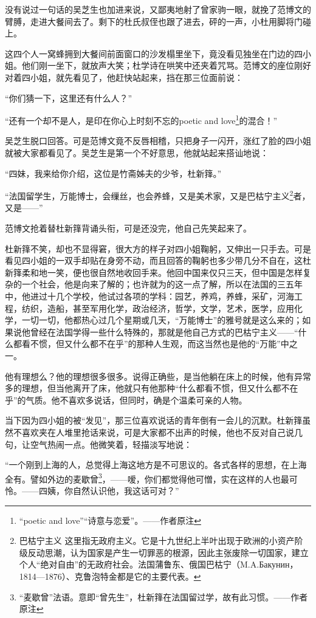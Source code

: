 \par 没有说过一句话的吴芝生也加进来说，又鄙夷地射了曾家驹一眼，就挽了范博文的臂膊，走进大餐间去了。剩下的杜氏叔侄也跟了进去，砰的一声，小杜用脚将门碰上。
\par 这四个人一窝蜂拥到大餐间前面窗口的沙发榻里坐下，竟没看见独坐在门边的四小姐。他们刚一坐下，就放声大笑；杜学诗在哄笑中还夹着咒骂。范博文的座位刚好对着四小姐，就先看见了，他赶快站起来，挡在那三位面前说：
\par “你们猜一下，这里还有什么人？”
\par “还有一个却不是人，是印在你心上时刻不忘的poetic and love\footnote{“poetic and love”“诗意与恋爱”。——作者原注}的混合！”
\par 吴芝生脱口回答。可是范博文竟不反唇相稽，只把身子一闪开，涨红了脸的四小姐就被大家都看见了。吴芝生是第一个不好意思，他就站起来搭讪地说：
\par “四妹，我来给你介绍，这位是竹斋姊夫的少爷，杜新箨。”
\par “法国留学生，万能博士，会缫丝，也会养蜂，又是美术家，又是巴枯宁主义\footnote{巴枯宁主义 这里指无政府主义。它是十九世纪上半叶出现于欧洲的小资产阶级反动思潮，认为国家是产生一切罪恶的根源，因此主张废除一切国家，建立个人“绝对自由”的无政府社会。法国蒲鲁东、俄国巴枯宁（M.A.Бакунин，1814—1876）、克鲁泡特金都是它的主要代表。}者，又是——”
\par 范博文抢着替杜新箨背诵头衔，可是还没完，他自己先笑起来了。
\par 杜新箨不笑，却也不显得窘，很大方的样子对四小姐鞠躬，又伸出一只手去。可是看见四小姐的一双手却贴在身旁不动，而且回答的鞠躬也多少带几分不自在，这杜新箨柔和地一笑，便也很自然地收回手来。他回中国来仅只三天，但中国是怎样复杂的一个社会，他是向来了解的；也许就为的这一点了解，所以在法国的三五年中，他进过十几个学校，他试过各项的学科：园艺，养鸡，养蜂，采矿，河海工程，纺织，造船，甚至军用化学，政治经济，哲学，文学，艺术，医学，应用化学，一切一切，他都热心过几个星期或几天，“万能博士”的雅号就是这么来的；如果说他曾经在法国学得一些什么特殊的，那就是他自己方式的巴枯宁主义——“什么都看不惯，但又什么都不在乎”的那种人生观，而这当然也是他的“万能”中之一。
\par 他有理想么？他的理想很多很多。说得正确些，是当他躺在床上的时候，他有异常多的理想，但当他离开了床，他就只有他那种“什么都看不惯，但又什么都不在乎”的气质。他不喜欢多说话，但同时，确是个温柔可亲的人物。
\par 当下因为四小姐的被“发见”，那三位喜欢说话的青年倒有一会儿的沉默。杜新箨虽然不喜欢夹在人堆里抢话来说，可是大家都不出声的时候，他也不反对自己说几句，让空气热闹一点。他微笑着，轻描淡写地说：
\par “一个刚到上海的人，总觉得上海这地方是不可思议的。各式各样的思想，在上海全有。譬如外边的麦歇曾\footnote{“麦歇曾”法语。意即“曾先生”，杜新箨在法国留过学，故有此习惯。——作者原注}，——嗳，你们都觉得他可憎，实在这样的人也最可怜。——四姨，你自然认识他，我这话可对？”
